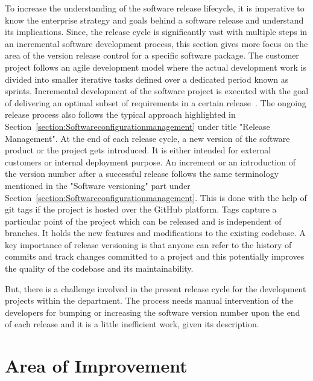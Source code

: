 To increase the understanding of the software release lifecycle, it is imperative to know the enterprise strategy and goals behind a software release and understand its implications. Since, the release cycle is significantly vast with multiple steps in an incremental software development process, this section gives more focus on the area of the version release control for a specific software package. The customer project follows an agile development model where the actual development work is divided into smaller iterative tasks defined over a dedicated period known as sprints. Incremental development of the software project is executed with the goal of delivering an optimal subset of requirements in a certain release~\parencite{wohlin2005important}. The ongoing release process also follows the typical approach highlighted in Section~\ref{section:Softwareconfigurationmanagement} under title "Release Management". At the end of each release cycle, a new version of the software product or the project gets introduced. It is either intended for external customers or internal deployment purpose. An increment or an introduction of the version number after a successful release follows the same terminology mentioned in the "Software versioning" part under Section~\ref{section:Softwareconfigurationmanagement}. This is done with the help of git tags if the project is hosted over the GitHub platform. Tags capture a particular point of the project which can be released and is independent of branches. It holds the new features and modifications to the existing codebase. A key importance of release versioning is that anyone can refer to the history of commits and track changes committed to a project and this potentially improves the quality of the codebase and its maintainability. 


But, there is a challenge involved in the present release cycle for the development projects within the department. The process needs manual intervention of the developers for bumping or increasing the software version number upon the end of each release and it is a little inefficient work, given its description.



\section{Area of Improvement}\label{section:Opportunities for Improvement}


